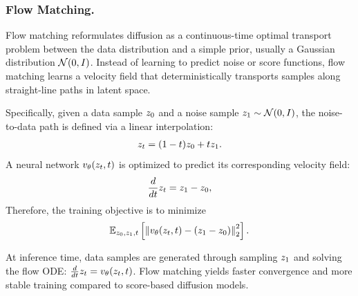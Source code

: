 \subsubsection{Flow Matching.} Flow matching \cite{lipman2023flow} reformulates diffusion as a continuous-time optimal transport problem between the data distribution and a simple prior, usually a Gaussian distribution $\mathcal{N}(0, I)$. Instead of learning to predict noise or score functions, flow matching learns a velocity field that deterministically transports samples along straight-line paths in latent space.

Specifically, given a data sample $z_0$ and a noise sample $z_1 \sim \mathcal{N}(0, I)$, the noise-to-data path is defined via a linear interpolation:
\begin{align}
    \latent[t]= (1 - t)\latentclean + t \latentnoise.
    \label{eq:noisy_latent}
\end{align}
A neural network \( v_\theta(\latent[t], t) \) is optimized to predict its corresponding velocity field: \vspace{-10pt}
\begin{align}
    \frac{d}{dt} z_t = z_1 - z_0,
\end{align}
Therefore, the training objective is to minimize
\begin{align}
    \mathbb{E}_{\latentclean, \latentnoise, t}
    \left[
        \left\|
            v_\theta(\latent[t], t) - (\latentnoise - \latentclean)
        \right\|_2^2
    \right].
    \label{eq:pred_flow}
\end{align}

At inference time, data samples are generated through sampling $\latent[1]$ and solving the flow ODE: $\frac{d}{dt} z_t = v_\theta(\latent[t], t)$. Flow matching yields faster convergence and more stable training compared to score-based diffusion models.

